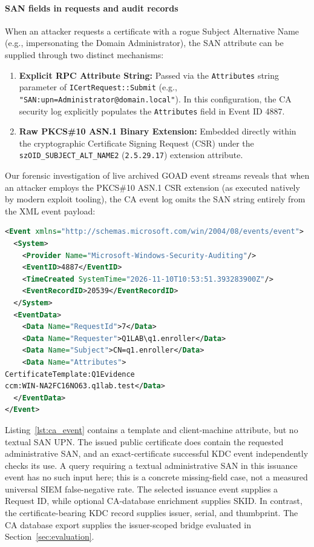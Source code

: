 \paragraph{SAN fields in requests and audit records}
When an attacker requests a certificate with a rogue Subject Alternative Name (e.g., impersonating the Domain Administrator), the SAN attribute can be supplied through two distinct mechanisms:
\begin{enumerate}
    \item \textbf{Explicit RPC Attribute String:} Passed via the \texttt{Attributes} string parameter of \texttt{ICertRequest::Submit} (e.g., \texttt{"SAN:upn=Administrator@domain.local"}). In this configuration, the CA security log explicitly populates the \texttt{Attributes} field in Event ID 4887.
    \item \textbf{Raw PKCS\#10 ASN.1 Binary Extension:} Embedded directly within the cryptographic Certificate Signing Request (CSR) under the \texttt{szOID\_SUBJECT\_ALT\_NAME2} (\texttt{2.5.29.17}) extension attribute.
\end{enumerate}

Our forensic investigation of live archived GOAD event streams reveals that when an attacker employs the PKCS\#10 ASN.1 CSR extension (as executed natively by modern exploit tooling), the CA event log omits the SAN string entirely from the XML event payload:
\begin{lstlisting}[language=XML,float=tbp,caption={Selected fields from the independent 2019 enabled-condition capture: Security record 20539. The raw XML is retained in the artifact.},label=lst:ca_event]
<Event xmlns="http://schemas.microsoft.com/win/2004/08/events/event">
  <System>
    <Provider Name="Microsoft-Windows-Security-Auditing"/>
    <EventID>4887</EventID>
    <TimeCreated SystemTime="2026-11-10T10:53:51.393283900Z"/>
    <EventRecordID>20539</EventRecordID>
  </System>
  <EventData>
    <Data Name="RequestId">7</Data>
    <Data Name="Requester">Q1LAB\q1.enroller</Data>
    <Data Name="Subject">CN=q1.enroller</Data>
    <Data Name="Attributes">
CertificateTemplate:Q1Evidence
ccm:WIN-NA2FC16NO63.q1lab.test</Data>
  </EventData>
</Event>
\end{lstlisting}

Listing~\ref{lst:ca_event} contains a template and client-machine attribute, but no textual SAN UPN. The issued public certificate does contain the requested administrative SAN, and an exact-certificate successful KDC event independently checks its use. A query requiring a textual administrative SAN in this issuance event has no such input here; this is a concrete missing-field case, not a measured universal SIEM false-negative rate. The selected issuance event supplies a Request ID, while optional CA-database enrichment supplies SKID. In contrast, the certificate-bearing KDC record supplies issuer, serial, and thumbprint. The CA database export supplies the issuer-scoped bridge evaluated in Section~\ref{sec:evaluation}.

